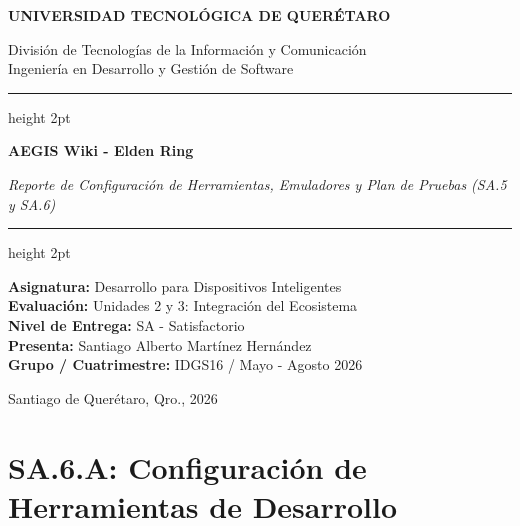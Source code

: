 \documentclass[11pt,a4paper]{article}
\begin{document}
\begin{titlepage}
    \centering
    \vspace*{0.5cm}
    {\fontsize{18}{22}\selectfont \textbf{UNIVERSIDAD TECNOLÓGICA DE QUERÉTARO} \par}
    \vspace{0.6cm}
    {\fontsize{14}{17}\selectfont División de Tecnologías de la Información y Comunicación \\ 
    Ingeniería en Desarrollo y Gestión de Software \par}
    \vspace{1.5cm}
    
    {\color{brown}\hrule height 2pt}
    \vspace{0.6cm}
    {\fontsize{20}{24}\selectfont \textbf{AEGIS Wiki - Elden Ring} \par}
    \vspace{0.4cm}
    {\fontsize{16}{20}\selectfont \textit{Reporte de Configuración de Herramientas, Emuladores y Plan de Pruebas (SA.5 y SA.6)} \par}
    \vspace{0.6cm}
    {\color{brown}\hrule height 2pt}
    
    \vspace{1.5cm}
    {\fontsize{12}{15}\selectfont
    \textbf{Asignatura:} Desarrollo para Dispositivos Inteligentes \\
    \vspace{0.2cm}
    \textbf{Evaluación:} Unidades 2 y 3: Integración del Ecosistema \\
    \vspace{0.2cm}
    \textbf{Nivel de Entrega:} SA - Satisfactorio \\
    \vspace{0.2cm}
    \textbf{Presenta:} Santiago Alberto Martínez Hernández \\
    \vspace{0.2cm}
    \textbf{Grupo / Cuatrimestre:} IDGS16 / Mayo - Agosto 2026 \par}
    
    \vfill
    {\large Santiago de Querétaro, Qro., 2026 \par}
\end{titlepage}

\newpage

\section{SA.6.A: Configuración de Herramientas de Desarrollo}
\end{document}
